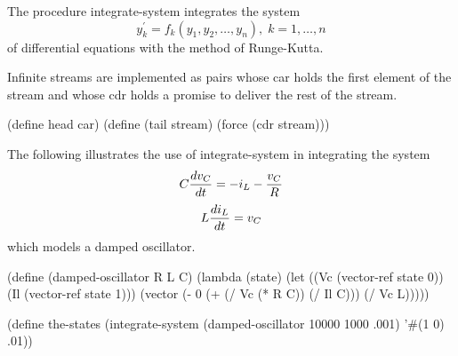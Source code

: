 

\nobreak
The procedure {\cf integrate-system} integrates the system 
$$y_k^\prime = f_k(y_1, y_2, \ldots, y_n), \; k = 1, \ldots, n$$
of differential equations with the method of Runge-Kutta.

Infinite streams are implemented as pairs whose car holds the first
element of the stream and whose cdr holds a promise to deliver the rest
of the stream.

\begin{schemenoindent}
(define head car)
(define (tail stream)
  (force (cdr stream)))%
\end{schemenoindent}

\bigskip
The following illustrates the use of {\cf integrate-system} in
integrating the system
$$ C {dv_C \over dt} = -i_L - {v_C \over R}$$\nobreak
$$ L {di_L \over dt} = v_C$$
which models a damped oscillator.

\begin{schemenoindent}
(define (damped-oscillator R L C)
  (lambda (state)
    (let ((Vc (vector-ref state 0))
          (Il (vector-ref state 1)))
      (vector (- 0 (+ (/ Vc (* R C)) (/ Il C)))
              (/ Vc L)))))

(define the-states
  (integrate-system
     (damped-oscillator 10000 1000 .001)
     '\#(1 0)
     .01))%
\end{schemenoindent}

